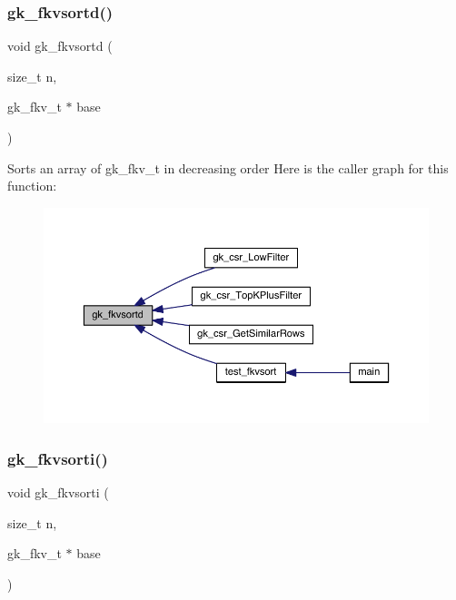 \subsubsection{\texorpdfstring{gk\+\_\+fkvsortd()}{gk\_fkvsortd()}}
{\footnotesize\ttfamily void gk\+\_\+fkvsortd (\begin{DoxyParamCaption}\item[{size\+\_\+t}]{n,  }\item[{gk\+\_\+fkv\+\_\+t $\ast$}]{base }\end{DoxyParamCaption})}

Sorts an array of gk\+\_\+fkv\+\_\+t in decreasing order Here is the caller graph for this function\+:\nopagebreak
\begin{figure}[H]
\begin{center}
\leavevmode
\includegraphics[width=350pt]{a00140_a0b1d86908a6e2acb384bc003e3bc40a0_icgraph}
\end{center}
\end{figure}
\mbox{\label{a00140_a3cf119da593511faacd54cb35ac8de4e}} 
\subsubsection{\texorpdfstring{gk\+\_\+fkvsorti()}{gk\_fkvsorti()}}
{\footnotesize\ttfamily void gk\+\_\+fkvsorti (\begin{DoxyParamCaption}\item[{size\+\_\+t}]{n,  }\item[{gk\+\_\+fkv\+\_\+t $\ast$}]{base }\end{DoxyParamCaption})}

